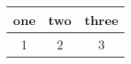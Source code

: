 \documentclass{article}
\begin{document}
\begin{tabular}{|c|c|c|}
\hline
one & two & three \\
\hline
1 & 2 & 3 \\
\hline
\end{tabular}
\end{document}
